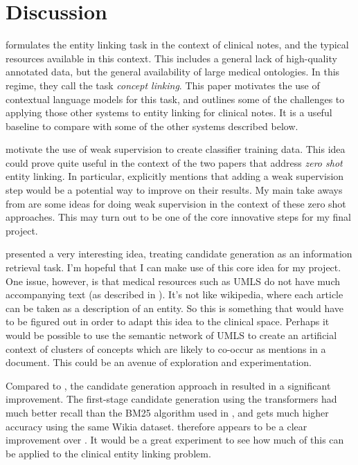 \documentclass{article}
\begin{document}
\section{Discussion}

\cite{schumacher_clinical_2020} formulates the entity linking task in the context of clinical notes, and the typical resources available in this context. This includes a general lack of high-quality annotated data, but the general availability of large medical ontologies. In this regime, they call the task \emph{concept linking}.  This paper motivates the use of contextual language models for this task, and outlines some of the challenges to applying those other systems to entity linking for clinical notes. It is a useful baseline to compare with some of the other systems described below.

\cite{dong_ontology-based_2022} motivate the use of weak supervision to create classifier training data. This idea could prove quite useful in the context of the two papers that address \emph{zero shot} entity linking. In particular, \cite{logeswaran_zero-shot_2019} explicitly mentions that adding a weak supervision step would be a potential way to improve on their results. My main take aways from \cite{dong_ontology-based_2022} are some ideas for doing weak supervision in the context of these zero shot approaches. This may turn out to be one of the core innovative steps for my final project.

\cite{logeswaran_zero-shot_2019} presented a very interesting idea, treating candidate generation as an information retrieval task. I'm hopeful that I can make use of this core idea for my project. One issue, however, is that medical resources such as UMLS do not have much accompanying text (as described in \cite{schumacher_clinical_2020}). It's not like wikipedia, where each article can be taken as a description of an entity. So this is something that would have to be figured out in order to adapt this idea to the clinical space. Perhaps it would be possible to use the semantic network of UMLS to create an artificial context of clusters of concepts which are likely to co-occur as mentions in a document. This could be an avenue of exploration and experimentation.


Compared to \cite{logeswaran_zero-shot_2019}, the candidate generation approach in \cite{wu_scalable_2020} resulted in a significant improvement. The first-stage candidate generation using the transformers had much better recall than the BM25 algorithm used in  \cite{logeswaran_zero-shot_2019}, and \cite{wu_scalable_2020} gets much higher accuracy using the same Wikia dataset. \cite{wu_scalable_2020}  therefore appears to be a clear improvement over \cite{logeswaran_zero-shot_2019}. It would be a great experiment to see how much of this can be applied to the clinical entity linking problem.
\end{document}
